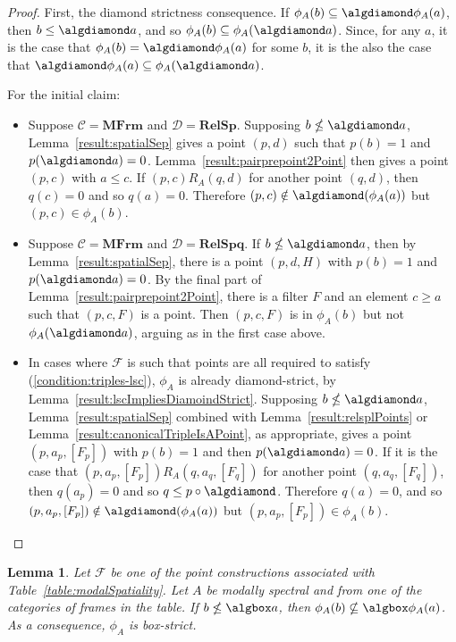 \documentclass{article}[a4paper]
\newtheorem{lemma}{Lemma}%
\theoremstyle{definition}
\newcommand{\Ccal}{\mathcal{C}} %
\newcommand{\Dcal}{\mathcal{D}} %
\newcommand{\Fcal}{\mathcal{F}} %
\newcommand{\relsp}{\mathbf{RelSp}}
\newcommand{\relspq}{\mathbf{RelSpq}}
\newcommand{\mfrm}{\mathbf{MFrm}}
\begin{document}
\begin{proof}
First, the diamond strictness consequence.   If $\phi_A (b) \subseteq \algdiamond \phi_A(a)$, then $b \leq \algdiamond a$, and so $\phi_A (b) \subseteq \phi_A (\algdiamond a)$. Since, for any $a$, it is the case that $\phi_A (b) = \algdiamond \phi_A(a)$ for some $b$, it is the also the case that $\algdiamond \phi_A (a) \subseteq \phi_A (\algdiamond a)$. 

For the initial claim: 
\begin{itemize}
    \item 
    Suppose $\Ccal = \mfrm$ and $\Dcal = \relsp$. Supposing $b \nleq \algdiamond a$, Lemma~\ref{result:spatialSep} gives a point $(p,d)$ such that $p(b) = 1$ and $p(\algdiamond a)=0$. 
 Lemma~\ref{result:pairprepoint2Point}  then gives a point $(p,c)$ with $a \leq c$. If $(p,c) R_A (q,d)$ for another point $(q,d)$, then $q(c) = 0$ and so $q(a)=0$. Therefore $(p,c) \notin \algdiamond (\phi_A (a))$ but $(p,c) \in \phi_A (b)$. 

    \item Suppose $\Ccal = \mfrm$ and $\Dcal = \relspq$. If $b\nleq \algdiamond a$, then by Lemma~\ref{result:spatialSep}, there is a point $(p,d,H)$ with $p(b)=1$ and $p(\algdiamond a)=0$. 
    By the final part of Lemma~\ref{result:pairprepoint2Point}, there is a filter $F$ and an element $c \geq a$ such that $(p,c,F)$ is a point. Then $(p,c,F)$ is in $\phi_A (b)$ but not $\phi_A (\algdiamond a)$, arguing as in the first case above.

    \item In cases where $\Fcal$ is such that points are all required to satisfy (\ref{condition:triples-lsc}), $\phi_A$ is already diamond-strict, by Lemma~\ref{result:lscImpliesDiamoindStrict}.
    Supposing $b\nleq \algdiamond a$, Lemma~\ref{result:spatialSep} combined with Lemma~\ref{result:relsplPoints} or Lemma~\ref{result:canonicalTripleIsAPoint}, as appropriate, gives a point $(p,a_p,[F_p])$ with $p(b) = 1$ and then $p(\algdiamond a)=0$. If it is the case that $(p,a_p,[F_p]) R_A (q,a_q,[F_q])$ for another point $(q,a_q,[F_q])$, then $q(a_p) = 0$ and so $q \leq p \circ \algdiamond$. Therefore $q(a)=0$, and so $(p,a_p,[F_p]) \notin \algdiamond (\phi_A (a))$ but $(p,a_p,[F_p]) \in \phi_A (b)$.
\end{itemize}
\end{proof}


\begin{lemma}
Let $\Fcal$ be one of the point constructions associated with Table~\ref{table:modalSpatiality}. 
Let $A$ be modally spectral and from one of the categories of frames in the table. 
If $b\nleq \algbox a$, then $\phi_A(b) \nsubseteq \algbox \phi_A(a)$.
As a consequence, $\phi_A$ is box-strict. 
\end{lemma}
\end{document}
